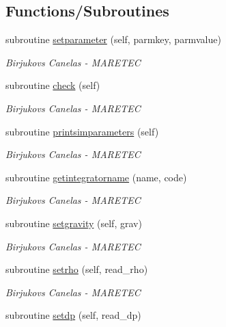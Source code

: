 \subsection*{Functions/\+Subroutines}
\begin{DoxyCompactItemize}
\item 
subroutine \hyperlink{namespacesimulation__globals_aed3f671899558008ae9f0f009f581baf}{setparameter} (self, parmkey, parmvalue)
\begin{DoxyCompactList}\small\item\em Birjukovs Canelas -\/ M\+A\+R\+E\+T\+EC \end{DoxyCompactList}\item 
subroutine \hyperlink{namespacesimulation__globals_a3867df0f77dca3700c9470aea24fd048}{check} (self)
\begin{DoxyCompactList}\small\item\em Birjukovs Canelas -\/ M\+A\+R\+E\+T\+EC \end{DoxyCompactList}\item 
subroutine \hyperlink{namespacesimulation__globals_a0b17b2f2e9e7dbbad7c9d735217c1ee1}{printsimparameters} (self)
\begin{DoxyCompactList}\small\item\em Birjukovs Canelas -\/ M\+A\+R\+E\+T\+EC \end{DoxyCompactList}\item 
subroutine \hyperlink{namespacesimulation__globals_a2c6bf88542c503d1da58280ab3dcf772}{getintegratorname} (name, code)
\begin{DoxyCompactList}\small\item\em Birjukovs Canelas -\/ M\+A\+R\+E\+T\+EC \end{DoxyCompactList}\item 
subroutine \hyperlink{namespacesimulation__globals_ac655f60155581a71b312f3c1a8c87db2}{setgravity} (self, grav)
\begin{DoxyCompactList}\small\item\em Birjukovs Canelas -\/ M\+A\+R\+E\+T\+EC \end{DoxyCompactList}\item 
subroutine \hyperlink{namespacesimulation__globals_acfdc640757f0275bccb1d8de7bd7dc92}{setrho} (self, read\+\_\+rho)
\begin{DoxyCompactList}\small\item\em Birjukovs Canelas -\/ M\+A\+R\+E\+T\+EC \end{DoxyCompactList}\item 
subroutine \hyperlink{namespacesimulation__globals_a9a8e88c06937b7cf6be9d9bf30f54ba9}{setdp} (self, read\+\_\+dp)

\end{DoxyCompactItemize}
